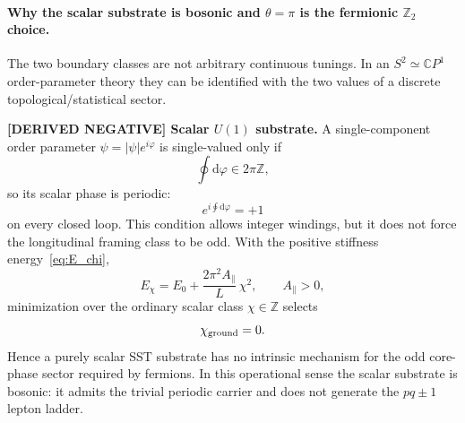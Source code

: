 \documentclass[11pt]{article}
\theoremstyle{definition}
\theoremstyle{plain}
\theoremstyle{remark}
\begin{document}
        \paragraph{Why the scalar substrate is bosonic and $\theta=\pi$ is the fermionic $\mathbb{Z}_2$ choice.}
        The two boundary classes are not arbitrary continuous tunings.  In an
        $S^2\simeq\mathbb{C}P^1$ order-parameter theory they can be identified with the two values
        of a discrete topological/statistical sector.

        \textbf{[DERIVED NEGATIVE] Scalar $U(1)$ substrate.}
        A single-component order parameter $\psi=|\psi|e^{i\varphi}$ is single-valued only if
        \begin{equation}
            \oint \mathrm{d}\varphi \in 2\pi\mathbb{Z},
        \end{equation}
        so its scalar phase is periodic:
        \begin{equation}
            e^{i\oint \mathrm{d}\varphi}=+1
        \end{equation}
        on every closed loop.  This condition allows integer windings, but it does not force
        the longitudinal framing class to be odd.  With the positive stiffness
        energy~\eqref{eq:E_chi},
        \begin{equation}
            E_\chi = E_0+\frac{2\pi^2 A_\parallel}{L}\,\chi^2,\qquad A_\parallel>0,
        \end{equation}
        minimization over the ordinary scalar class $\chi\in\mathbb{Z}$ selects
        \begin{equation}
            \chi_{\rm ground}=0 .
        \end{equation}
        Hence a purely scalar SST substrate has no intrinsic mechanism for the odd core-phase
        sector required by fermions.  In this operational sense the scalar substrate is bosonic:
        it admits the trivial periodic carrier and does not generate the $pq\pm1$ lepton ladder.
\end{document}
